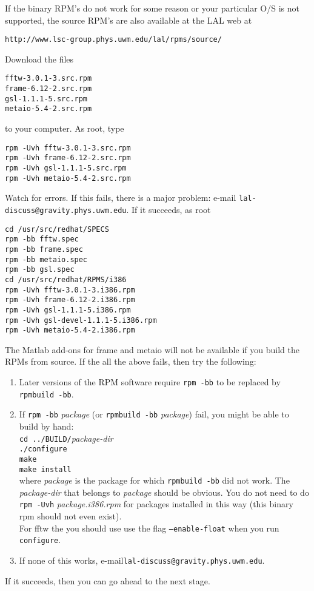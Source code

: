 If the binary RPM's do not work for some reason or your particular O/S
is not supported,   the source RPM's are also available at the LAL web
at
\begin{verbatim}
http://www.lsc-group.phys.uwm.edu/lal/rpms/source/
\end{verbatim}
Download the files
\begin{verbatim}
fftw-3.0.1-3.src.rpm
frame-6.12-2.src.rpm
gsl-1.1.1-5.src.rpm
metaio-5.4-2.src.rpm
\end{verbatim}
to your computer.  As root,   type
\begin{verbatim}
rpm -Uvh fftw-3.0.1-3.src.rpm
rpm -Uvh frame-6.12-2.src.rpm
rpm -Uvh gsl-1.1.1-5.src.rpm
rpm -Uvh metaio-5.4-2.src.rpm
\end{verbatim}
Watch for errors.  If this fails,  there is a major problem:  e-mail
\verb+lal-discuss@gravity.phys.uwm.edu+.    If it succeeds,  as root
\begin{verbatim}
cd /usr/src/redhat/SPECS
rpm -bb fftw.spec
rpm -bb frame.spec
rpm -bb metaio.spec
rpm -bb gsl.spec
cd /usr/src/redhat/RPMS/i386
rpm -Uvh fftw-3.0.1-3.i386.rpm
rpm -Uvh frame-6.12-2.i386.rpm
rpm -Uvh gsl-1.1.1-5.i386.rpm
rpm -Uvh gsl-devel-1.1.1-5.i386.rpm
rpm -Uvh metaio-5.4-2.i386.rpm
\end{verbatim}
The Matlab add-ons for frame and metaio will not be available if you build the
RPMs from source.  If the all the above fails, then try the following:
\begin{enumerate}
   \item Later versions of the RPM software require \verb+rpm -bb+ to be 
      replaced by \verb+rpmbuild -bb+. 
   \item If \verb+rpm -bb+ \textit{package} (or \verb+rpmbuild -bb+
      \textit{package}) fail, you might be able to build by hand:\\
      \verb+cd ../BUILD/+\textit{package-dir}\\
      \verb+./configure+\\
      \verb+make+\\
      \verb+make install+\\
      where \textit{package} is the package for which \verb+rpmbuild -bb+ 
      did not work. The \textit{package-dir} that belongs to 
      \textit{package} should be obvious. You do not need to do \verb+rpm -Uvh+ 
      \textit{ package.i386.rpm} for packages installed in this way (this
      binary rpm should not even exist).\\
      For fftw the you should use use the flag \texttt{--enable-float}
      when you run \texttt{configure}.
   \item If none of this works, e-mail\verb+lal-discuss@gravity.phys.uwm.edu+.   
\end{enumerate}
If it succeeds,  then you can go ahead to the next stage.   

